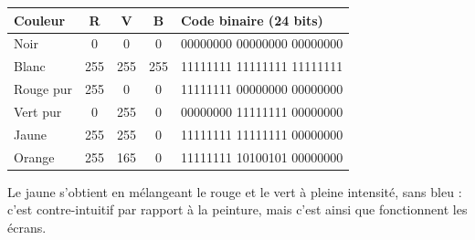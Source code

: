 \documentclass[11pt]{article}
\begin{document}
\begin{exemplebox}
\begin{center}
\begin{tabularx}{\linewidth}{|l|c|c|c|X|}
\hline
\rowcolor{popblueL} \textbf{Couleur} & \textbf{R} & \textbf{V} & \textbf{B} & \textbf{Code binaire (24 bits)} \\
\hline
Noir & 0 & 0 & 0 & 00000000 00000000 00000000 \\
\hline
Blanc & 255 & 255 & 255 & 11111111 11111111 11111111 \\
\hline
Rouge pur & 255 & 0 & 0 & 11111111 00000000 00000000 \\
\hline
Vert pur & 0 & 255 & 0 & 00000000 11111111 00000000 \\
\hline
Jaune & 255 & 255 & 0 & 11111111 11111111 00000000 \\
\hline
Orange & 255 & 165 & 0 & 11111111 10100101 00000000 \\
\hline
\end{tabularx}
\end{center}
Le jaune s'obtient en mélangeant le rouge et le vert à pleine intensité, sans bleu : c'est contre-intuitif par rapport à la peinture, mais c'est ainsi que fonctionnent les écrans.
\end{exemplebox}
\end{document}
